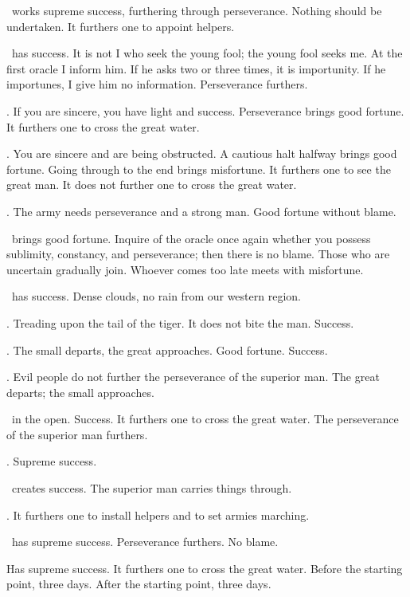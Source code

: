 {\nameit\ works supreme success,
 furthering through perseverance.
 Nothing should be undertaken.
 It furthers one to appoint helpers.}

{\nameit\ has success.
 It is not I who seek the young fool;
 the young fool seeks me.
 At the first oracle I inform him.
 If he asks two or three times, it is importunity.
 If he importunes, I give him no information.
 Perseverance furthers.}

{\nameit. If you are sincere,
 you have light and success.
 Perseverance brings good fortune.
 It furthers one to cross the great water.}

{\nameit. You are sincere
 and are being obstructed.
 A cautious halt halfway brings good fortune.
 Going through to the end brings misfortune.
 It furthers one to see the great man.
 It does not further one to cross the great water.}

{\nameit. The army needs perseverance
 and a strong man.
 Good fortune without blame.}

{\nameit\ brings good fortune.
 Inquire of the oracle once again
 whether you possess sublimity, constancy, and perseverance;
 then there is no blame.
 Those who are uncertain gradually join.
 Whoever comes too late
 meets with misfortune.}

{\nameit\ has success.
 Dense clouds, no rain from our western region.}

{\nameit. Treading upon the tail of the tiger.
 It does not bite the man. Success.}

{\nameit. The small departs,
 the great approaches.
 Good fortune. Success.}

{\nameit. Evil people do not further
 the perseverance of the superior man.
 The great departs; the small approaches.}

{\nameit\ in the open.
 Success.
 It furthers one to cross the great water.
 The perseverance of the superior man furthers.}

{\nameit.
 Supreme success.}

{\nameit\ creates success.
 The superior man carries things through.}

{\nameit. It furthers one to install helpers
 and to set armies marching.}

{\nameit\ has supreme success.
 Perseverance furthers. No blame.}

{\nameit
 Has supreme success.
 It furthers one to cross the great water.
 Before the starting point, three days.
 After the starting point, three days.}

